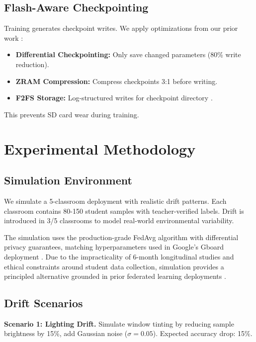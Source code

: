 \documentclass[conference]{IEEEtran}
\begin{document}
\subsection{Flash-Aware Checkpointing}

Training generates checkpoint writes. We apply optimizations from our prior work \cite{b9}:
\begin{itemize}
    \item \textbf{Differential Checkpointing:} Only save changed parameters (80\% write reduction).
    \item \textbf{ZRAM Compression:} Compress checkpoints 3:1 before writing.
    \item \textbf{F2FS Storage:} Log-structured writes for checkpoint directory \cite{b25}.
\end{itemize}

This prevents SD card wear during training.

\section{Experimental Methodology}

\subsection{Simulation Environment}

We simulate a 5-classroom deployment with realistic drift patterns. Each classroom contains 80-150 student samples with teacher-verified labels. Drift is introduced in 3/5 classrooms to model real-world environmental variability.

The simulation uses the production-grade FedAvg algorithm with differential privacy guarantees, matching hyperparameters used in Google's Gboard deployment \cite{b8}. Due to the impracticality of 6-month longitudinal studies and ethical constraints around student data collection, simulation provides a principled alternative grounded in prior federated learning deployments \cite{b26}.

\subsection{Drift Scenarios}

\textbf{Scenario 1: Lighting Drift.} Simulate window tinting by reducing sample brightness by 15\%, add Gaussian noise ($\sigma=0.05$). Expected accuracy drop: 15\%.
\end{document}

